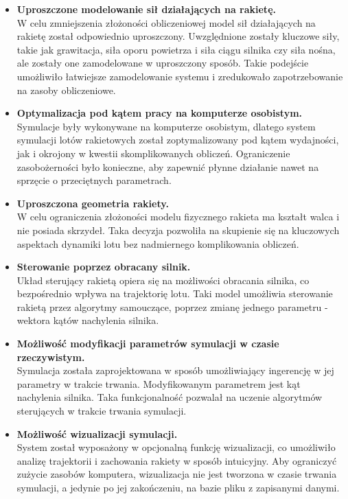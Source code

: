 \begin{itemize}

\item \textbf{Uproszczone modelowanie sił działających na rakietę.} \\
W celu zmniejszenia złożoności obliczeniowej model sił działających na rakietę został odpowiednio uproszczony. Uwzględnione zostały kluczowe siły, takie jak grawitacja, siła oporu powietrza i siła ciągu silnika czy siła nośna, ale zostały one zamodelowane w uproszczony sposób. Takie podejście umożliwiło łatwiejsze zamodelowanie systemu i zredukowało zapotrzebowanie na zasoby obliczeniowe.

\item \textbf{Optymalizacja pod kątem pracy na komputerze osobistym.} \\
Symulacje były wykonywane na komputerze osobistym, dlatego system symulacji lotów rakietowych został zoptymalizowany pod kątem wydajności, jak i okrojony w kwestii skomplikowanych obliczeń. Ograniczenie zasobożerności było konieczne, aby zapewnić płynne działanie nawet na sprzęcie o przeciętnych parametrach.

\item \textbf{Uproszczona geometria rakiety.} \\
W celu ograniczenia złożoności modelu fizycznego rakieta ma kształt walca i
nie posiada skrzydeł. Taka decyzja pozwoliła na skupienie się na kluczowych aspektach dynamiki lotu bez nadmiernego komplikowania obliczeń.

\item \textbf{Sterowanie poprzez obracany silnik.} \\
Układ sterujący rakietą opiera się na możliwości obracania silnika, co
bezpośrednio wpływa na trajektorię lotu. Taki model umożliwia sterowanie
rakietą przez algorytmy samouczące, poprzez zmianę jednego parametru -
wektora kątów nachylenia silnika.

\item \textbf{Możliwość modyfikacji parametrów symulacji w czasie rzeczywistym.} \\
Symulacja została zaprojektowana w sposób umożliwiający ingerencję w jej
parametry w trakcie trwania. Modyfikowanym parametrem jest kąt
nachylenia silnika. Taka funkcjonalność pozwalał na uczenie algorytmów
sterujących w trakcie trwania symulacji.

\item \textbf{Możliwość wizualizacji symulacji.} \\
System został wyposażony w opcjonalną funkcję wizualizacji, co umożliwiło
analizę trajektorii i zachowania rakiety w sposób intuicyjny. Aby ograniczyć
zużycie zasobów komputera, wizualizacja nie jest tworzona w czasie trwania
symulacji, a jedynie po jej zakończeniu, na bazie pliku z zapisanymi danymi.

\end{itemize}


